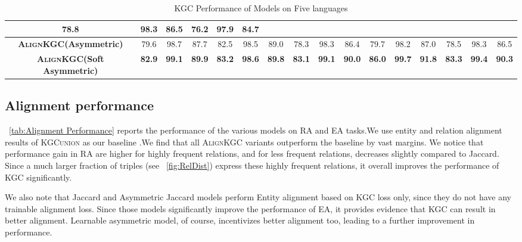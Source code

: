 \documentclass[11pt]{article}
\def\KbcUnion{\textsc{KGC\-union}}
\def\shortname{\textsc{Align\-KGC}}
\begin{document}
\begin{table*}
{\begin{tabular}{|
        c |
        c |
        c |
        c |
        c |
        c |
        c |
        c |
        c |
        c |
        c |
        c |
        c |
        c |
        c |
        c |}
          78.8 &
          98.3 &
          86.5 &
          76.2 &
          97.9 &
          84.7 \\ \hline
        \textbf{\shortname(Asymmetric)} &
          79.6 &
          98.7 &
          87.7 &
          82.5 &
          98.5 &
          89.0 &
          78.3 &
          98.3 &
          86.4 &
          79.7 &
          98.2 &
          87.0 &
          78.5 &
          98.3 &
          86.5 \\ \hline
        \textbf{\shortname(Soft Asymmetric)} &
          \textbf{82.9} &
          \textbf{99.1} &
          \textbf{89.9} &
          \textbf{83.2} &
          \textbf{98.6} &
          \textbf{89.8} &
          \textbf{83.1} &
          \textbf{99.1} &
          \textbf{90.0} &
          \textbf{86.0} &
          \textbf{99.7} &
          \textbf{91.8} &
          \textbf{83.3} &
          \textbf{99.4} &
          \textbf{90.3} \\ \hline
        \end{tabular}}
    \caption{KGC Performance of Models on Five languages}
    \label{tab:Learnable Asymmetric Performance}
\end{table*}

\subsection{Alignment performance}

\tablename~\ref{tab:Alignment Performance} reports the performance of the various models on RA and EA tasks.We use entity and relation alignment results of \KbcUnion{} as our baseline .We find that all \shortname{} variants outperform the baseline by vast margins. We notice that performance gain in RA are higher for highly frequent relations, and for less frequent relations, decreases slightly compared to Jaccard. Since a much larger fraction of triples (see \figurename~\ref{fig:RelDist}) express these highly frequent relations, it overall improves the performance of KGC significantly. 



We also note that Jaccard and Asymmetric Jaccard models perform Entity alignment based on KGC loss only, since they do not have any trainable alignment loss. Since those models significantly improve the performance of EA, it provides evidence that KGC can result in better alignment. Learnable asymmetric model, of course, incentivizes better alignment too, leading to a further improvement in performance.
\end{document}
